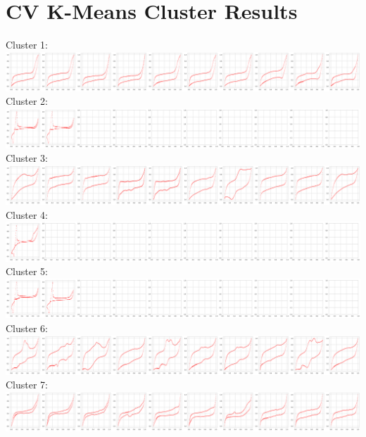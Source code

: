 \appendix 
\makeatletter
{}
\makeatother
\renewcommand{\thechapter}{\Alph{chapter}}
\label{appendix}

\chapter{CV K-Means Cluster Results}
Cluster 1:\\
\includegraphics[width=1.0\textwidth]{figures/clusters/cv_cluster1.png}
Cluster 2:\\
\includegraphics[width=1.0\textwidth]{figures/clusters/cv_cluster2.png}
Cluster 3:\\
\includegraphics[width=1.0\textwidth]{figures/clusters/cv_cluster3.png}
Cluster 4:\\
\includegraphics[width=1.0\textwidth]{figures/clusters/cv_cluster4.png}
Cluster 5:\\
\includegraphics[width=1.0\textwidth]{figures/clusters/cv_cluster5.png}
Cluster 6:\\
\includegraphics[width=1.0\textwidth]{figures/clusters/cv_cluster6.png}
Cluster 7:\\
\includegraphics[width=1.0\textwidth]{figures/clusters/cv_cluster7.png}
